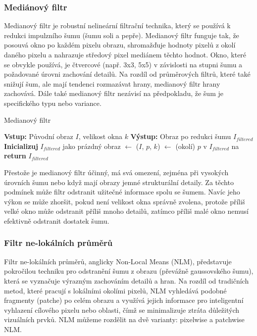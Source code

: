 \documentclass[male,czech,api_ing]{thesis}
\begin{document}
\subsubsection{Mediánový filtr}
Medianový filtr je robustní nelineární filtrační technika, který se používá k redukci impulzního šumu (šumu soli a pepře). Medianový filtr funguje tak, že posouvá okno po každém pixelu obrazu, shromažďuje hodnoty pixelů z okolí daného pixelu a nahrazuje středový pixel mediánem těchto hodnot. Okno, které se obvykle používá, je čtvercové (např. 3x3, 5x5) v závislosti na stupni šumu a požadované úrovni zachování detailů. Na rozdíl od průměrových filtrů, které také snižují šum, ale mají tendenci rozmazávat hrany, medianový filtr hrany zachovává. Dále také medianový filtr nezávisí na předpokladu, že šum je specifického typu nebo variance.

\begin{algorithm}
    \caption{Medianový filtr}
    \begin{algorithmic}[1]
        \State \textbf{Vstup:} Původní obraz $I$, velikost okna $k$
        \State \textbf{Výstup:} Obraz po redukci šumu $I_{filtered}$
        \State \textbf{Inicializuj} $I_{filtered}$ jako prázdný obraz
            \State {} $\gets$ ($I$, $p$, $k$)
            \State {} $\gets$ (okolí)
            \State {} $p$ v $I_{filtered}$ na 
        \EndFor
        \State \textbf{return} $I_{filtered}$
    \end{algorithmic}
\end{algorithm}

Přestože je medianový filtr účinný, má svá omezení, zejména při vysokých úrovních šumu nebo když mají obrazy jemné strukturální detaily. Za těchto podmínek může filtr odstranit užitečné informace spolu se šumem. Navíc jeho výkon se může zhoršit, pokud není velikost okna správně zvolena, protože příliš velké okno může odstranit příliš mnoho detailů, zatímco příliš malé okno nemusí efektivně odstranit dostatek šumu.

\subsubsection{Filtr ne-lokálních průměrů}
Filtr ne-lokálních průměrů, anglicky Non-Local Means (NLM), představuje pokročilou techniku pro odstranění šumu z obrazu (převážně gaussovského šumu), která se vyznačuje výrazným zachováním detailů a hran. Na rozdíl od tradičních metod, které pracují s lokálními okolími pixelů, NLM vyhledává podobné fragmenty (patche) po celém obrazu a využívá jejich informace pro inteligentní vyhlazení cílového pixelu nebo oblasti, čímž se minimalizuje ztráta důležitých vizuálních prvků. NLM můžeme rozdělit na dvě varianty: pixelwise a patchwise NLM.
\end{document}
